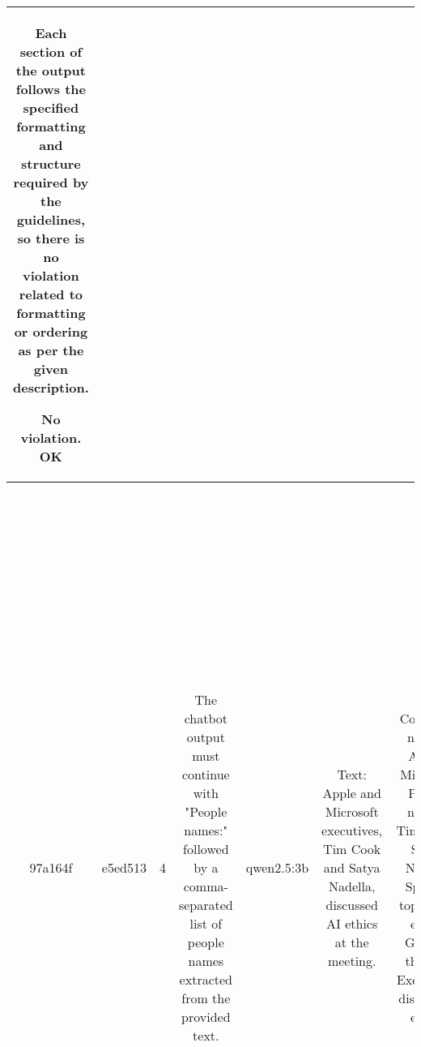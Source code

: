 \begin{table}[h!]
\begin{tabular}{|c|c|c|c|c|c|c|c|c|c|}
Each section of the output follows the specified formatting and structure required by the guidelines, so there is no violation related to formatting or ordering as per the given description.

No violation.
OK & \\
\hline
97a164f & e5ed513 & 4 & The chatbot output must continue with "People names:" followed by a comma-separated list of people names extracted from the provided text. & qwen2.5:3b & Text: Apple and Microsoft executives, Tim Cook and Satya Nadella, discussed AI ethics at the meeting. & Company names: Apple, Microsoft
People names: Tim Cook, Satya Nadella
Specific topics: AI ethics
General themes: Executives discussing ethics & ok & The output appears to follow the desired format closely. The sections are clearly separated: "Company names", "People names", "Specific topics", and "General themes". Each section is provided with a comma-separated list or a brief description. There is no indication in the chatbot's output that it violates the format prescribed in the description. The information given adheres to the specified order, and it comprehensively fills out each required category.

No violation.
OK & \\
\hline
9f1e22f & e5ed513 & 4 & The chatbot output must continue with "People names:" followed by a comma-separated list of people names extracted from the provided text. & qwen2.5:3b & Text: Alphabet Inc.'s research project was presented by Sergey Brin, raising important questions. & Company names: Alphabet Inc.
People names: Sergey Brin
Specific topics: research project, Alphabet Inc., important questions
General themes: technology, innovation & err & The evaluation of the chatbot output suggests that there are compliance issues. Let's break it down:

1. The format specified requires a comma-separated list for each category, even if there is only one item in that category. The list under "Company names" contains "Alphabet Inc." with no formatting issue as it's a single item. However, "Specific topics" should contain a comma-separated list similar to the others but instead each topic is not separated by commas, rather is separated by spaces.

2. The order of extraction and listing is observed correctly, with company names first, followed by people names, specific topics, and general themes. However, the formatting of specific topics diverges from the listed guidelines.


\end{tabular}
\end{table}

